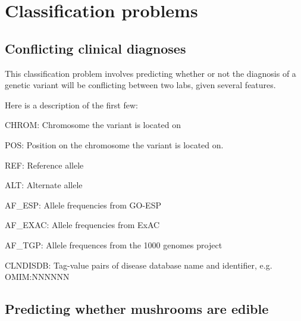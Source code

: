 \documentclass[11pt]{article}
\begin{document}
        \section{Classification problems}
            \subsection{Conflicting clinical diagnoses}

            This classification problem involves predicting whether or not the diagnosis of a genetic variant
            will be conflicting between two labs, given several features.

            Here is a description of the first few:

            CHROM: Chromosome the variant is located on

            POS: Position on the chromosome the variant is located on.

            REF: Reference allele
            
            ALT: Alternate allele
            
            AF_ESP: Allele frequencies from GO-ESP
            
            AF_EXAC: Allele frequencies from ExAC
            
            AF_TGP: Allele frequences from the 1000 genomes project
            
            CLNDISDB: Tag-value pairs of disease database name and identifier, e.g. OMIM:NNNNNN
            \subsection{Predicting whether mushrooms are edible}
\end{document}
